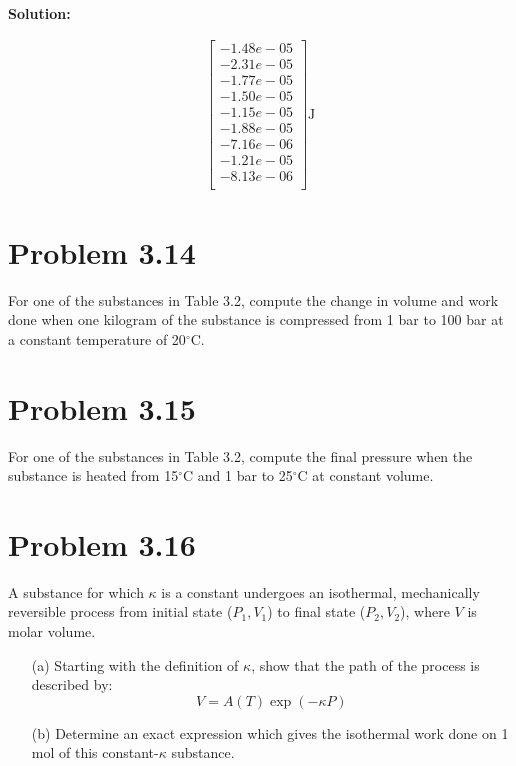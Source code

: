 \documentclass{article}
\newenvironment{solution}{\par\noindent\textbf{\\Solution:\\}}{\par\medskip}
\begin{document}
\begin{solution}
\begin{center}
{\begin{minipage}{0pt}
\begin{align*}
\begin{bmatrix}
                      -1.48e-05 \\
                      -2.31e-05 \\
                      -1.77e-05 \\
                      -1.50e-05 \\
                      -1.15e-05 \\
                      -1.88e-05 \\
                      -7.16e-06 \\
                      -1.21e-05 \\
                      -8.13e-06 \\
                  \end{bmatrix}
                  \si{\joule}
              \end{align*}
          \end{minipage}
          \hspace{0pt}
      }
\end{center}
\end{solution}

\section*{Problem 3.14}
For one of the substances in Table 3.2, compute the change in volume and work done when one kilogram of the substance is compressed from 1 bar to 100 bar at a constant temperature of 20$^\circ$C.

\bigskip

\section*{Problem 3.15}
For one of the substances in Table 3.2, compute the final pressure when the substance is heated from 15$^\circ$C and 1 bar to 25$^\circ$C at constant volume.

\bigskip

\section*{Problem 3.16}
A substance for which $\kappa$ is a constant undergoes an isothermal, mechanically reversible process from initial state ($P_1, V_1$) to final state ($P_2, V_2$), where $V$ is molar volume.
\begin{enumerate}
    \item[(a)] Starting with the definition of $\kappa$, show that the path of the process is described by:
    $$V = A(T)\exp(-\kappa P)$$
    \item[(b)] Determine an exact expression which gives the isothermal work done on 1 mol of this constant-$\kappa$ substance.
\end{enumerate}
\end{document}

